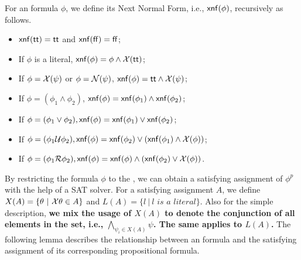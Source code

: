 \begin{definition}\label{def:xnf}
For an \ltlf formula $\phi$, we define its Next Normal Form, i.e., ${\sf xnf}(\phi)$, recursively as follows. 
\begin{itemize}
\item ${\sf xnf}({\sf tt}) = {\sf tt}$ and ${\sf xnf}({\sf ff}) = {\sf ff}$;
\item If $\phi$ is a literal, ${\sf xnf}(\phi) = \phi \wedge \mathcal{X}({\sf tt})$;
\item If $\phi = \mathcal{X}(\psi)$ or $\phi = \mathcal{N}(\psi)$, ${\sf xnf}(\phi) = {\sf tt} \wedge \mathcal{X}(\psi)$;
\item If $\phi = (\phi_1 \wedge \phi_2)$, ${\sf xnf}(\phi) = {\sf xnf}(\phi_1)\wedge{\sf xnf}(\phi_2)$;
\item If $\phi = (\phi_1 \vee \phi_2), {\sf xnf}(\phi) = {\sf xnf}(\phi_1)\vee {\sf xnf}(\phi_2)$; 
\item If $\phi = (\phi_1 \mathcal{U} \phi_2), {\sf xnf}(\phi) = {\sf xnf}(\phi_2) \vee ({\sf xnf}(\phi_1) \wedge \mathcal{X}(\phi))$; 
\item If $\phi = (\phi_1 \mathcal{R} \phi_2), {\sf xnf}(\phi) = {\sf xnf}(\phi)\wedge ({\sf xnf}(\phi_2) \vee \mathcal{X}(\phi))$.
\end{itemize}
\end{definition}

By restricting the \ltlf formula $\phi$ to the \XNF, we can obtain a satisfying assignment of $\phi^{p}$ with the help of a SAT solver.
For a satisfying assignment $A$, we define $X(A)=\{\theta\ |\ \mathcal{X}\theta\in A\}$ and $L(A) =\{l\ |\ l \textit{ is a literal}\}$. Also for the simple description, \textbf{we mix the usage of $X(A)$ to denote the conjunction of all elements in the set, i.e., $\bigwedge_{\psi_i\in X(A)}\psi$. The same applies to $L(A)$.}
The following lemma describes the relationship between an \ltlf formula and the satisfying assignment of its corresponding propositional formula.

